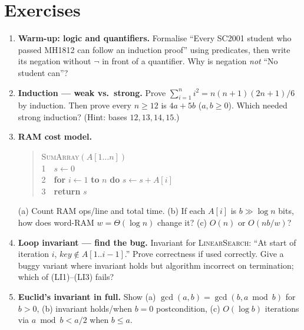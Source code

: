 \section{Exercises}
\label{sec:ch01-exercises}
\begin{enumerate}[label=E1.\arabic*, leftmargin=*, itemsep=0.8em]
\item \textbf{Warm-up: logic and quantifiers.} Formalise ``Every SC2001 student who passed MH1812 can follow an induction proof'' using predicates, then write its negation without $\neg$ in front of a quantifier. Why is negation \emph{not} ``No student can''?
\item \textbf{Induction --- weak vs.\ strong.} Prove $\sum_{i=1}^{n}i^2=n(n+1)(2n+1)/6$ by induction. Then prove every $n\ge12$ is $4a+5b$ ($a,b\ge0$). Which needed strong induction? (Hint: bases $12,13,14,15$.)
\item \textbf{RAM cost model.} \begin{quote}\ttfamily\textsc{SumArray}$(A[1\ldots n])$\\1\ \ $s\gets0$\\2\ \ \textbf{for} $i\gets1$ \textbf{to} $n$ \textbf{do} $s\gets s+A[i]$\\3\ \ \textbf{return} $s$\end{quote} (a) Count RAM ops/line and total time. (b) If each $A[i]$ is $b\gg\log n$ bits, how does word-RAM $w=\Theta(\log n)$ change it? (c) $O(n)$ or $O(nb/w)$?
\item \textbf{Loop invariant --- find the bug.} Invariant for \textsc{LinearSearch}: ``At start of iteration $i$, $key\notin A[1..i-1]$.'' Prove correctness if used correctly. Give a buggy variant where invariant holds but algorithm incorrect on termination; which of (LI1)--(LI3) fails?
\item \textbf{Euclid's invariant in full.} Show (a) $\gcd(a,b)=\gcd(b,a\bmod b)$ for $b>0$, (b) invariant holds/when $b=0$ postcondition, (c) $O(\log b)$ iterations via $a\bmod b<a/2$ when $b\le a$.
\end{enumerate}
